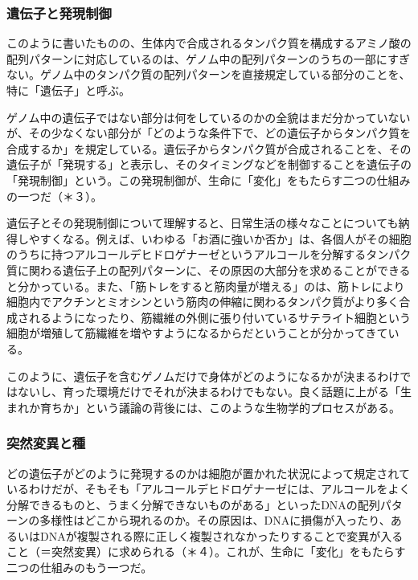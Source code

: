 \subsubsection{遺伝子と発現制御}\label{ux907aux4f1dux5b50ux3068ux767aux73feux5236ux5fa1}

このように書いたものの、生体内で合成されるタンパク質を構成するアミノ酸の配列パターンに対応しているのは、ゲノム中の配列パターンのうちの一部にすぎない。ゲノム中のタンパク質の配列パターンを直接規定している部分のことを、特に「遺伝子」と呼ぶ。

ゲノム中の遺伝子ではない部分は何をしているのかの全貌はまだ分かっていないが、その少なくない部分が「どのような条件下で、どの遺伝子からタンパク質を合成するか」を規定している。遺伝子からタンパク質が合成されることを、その遺伝子が「発現する」と表示し、そのタイミングなどを制御することを遺伝子の「発現制御」という。この発現制御が、生命に「変化」をもたらす二つの仕組みの一つだ（＊３）。

遺伝子とその発現制御について理解すると、日常生活の様々なことについても納得しやすくなる。例えば、いわゆる「お酒に強いか否か」は、各個人がその細胞のうちに持つアルコールデヒドロゲナーゼというアルコールを分解するタンパク質に関わる遺伝子上の配列パターンに、その原因の大部分を求めることができると分かっている。また、「筋トレをすると筋肉量が増える」のは、筋トレにより細胞内でアクチンとミオシンという筋肉の伸縮に関わるタンパク質がより多く合成されるようになったり、筋繊維の外側に張り付いているサテライト細胞という細胞が増殖して筋繊維を増やすようになるからだということが分かってきている。

このように、遺伝子を含むゲノムだけで身体がどのようになるかが決まるわけではないし、育った環境だけでそれが決まるわけでもない。良く話題に上がる「生まれか育ちか」という議論の背後には、このような生物学的プロセスがある。

\subsubsection{突然変異と種}\label{ux7a81ux7136ux5909ux7570ux3068ux7a2e}

どの遺伝子がどのように発現するのかは細胞が置かれた状況によって規定されているわけだが、そもそも「アルコールデヒドロゲナーゼには、アルコールをよく分解できるものと、うまく分解できないものがある」といったDNAの配列パターンの多様性はどこから現れるのか。その原因は、DNAに損傷が入ったり、あるいはDNAが複製される際に正しく複製されなかったりすることで変異が入ること（＝突然変異）に求められる（＊４）。これが、生命に「変化」をもたらす二つの仕組みのもう一つだ。

